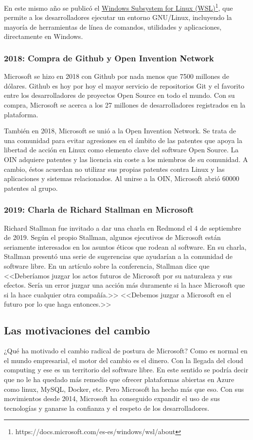 En este mismo año se publicó el \href{https://docs.microsoft.com/es-es/windows/wsl/about}{Windows Subsystem for Linux (WSL)}\footnote{https://docs.microsoft.com/es-es/windows/wsl/about}, que permite a los desarrolladores ejecutar un entorno GNU/Linux, incluyendo la mayoría de herramientas de línea de comandos, utilidades y aplicaciones, directamente en Windows.

\subsubsection{2018: Compra de Github y Open Invention Network}
Microsoft se hizo en 2018 con Github por nada menos que 7500 millones de dólares. Github es hoy por hoy el mayor servicio de repositorios Git y el favorito entre los desarrolladores de proyectos Open Source en todo el mundo. Con su compra, Microsoft se acerca a los 27 millones de desarrolladores registrados en la plataforma. \cite{xataca_2018:microsoft_gighub}

También en 2018, Microsoft se unió a la Open Invention Network. Se trata de una comunidad para evitar agresiones en el ámbito de las patentes que apoya la libertad de acción en Linux como elemento clave del software Open Source. La OIN adquiere patentes y las licencia sin coste a los miembros de su comunidad. A cambio, éstos acuerdan no utilizar sus propias patentes contra Linux y las aplicaciones y sistemas relacionados\cite{wiki_2020:open_invention_network}. Al unirse a la OIN, Microsoft abrió 60000 patentes al grupo\cite{azure_blogs_2018:microsoft_oin}.

\subsubsection{2019: Charla de Richard Stallman en Microsoft}
Richard Stallman fue invitado a dar una charla en Redmond el 4 de septiembre de 2019. Según el propio Stallman, algunos ejecutivos de Microsoft están seriamente interesados en los asuntos éticos que rodean al software. En su charla, Stallman presentó una serie de sugerencias que ayudarían a la comunidad de software libre. En un artículo sobre la conferencia, Stallman dice que <<Deberíamos juzgar los actos futuros de Microsoft por su naturaleza y sus efectos. Sería un error juzgar una acción más duramente si la hace Microsoft que si la hace cualquier otra compañía.>> <<Debemos juzgar a Microsoft en el futuro por lo que haga entonces.>> \cite{stallman_2019}

\subsection{Las motivaciones del cambio}
¿Qué ha motivado el cambio radical de postura de Microsoft? Como es normal en el mundo empresarial, el motor del cambio es el dinero. Con la llegada del cloud computing y ese es un territorio del software libre. En este sentido se podría decir que no le ha quedado más remedio que ofrecer plataformas abiertas en Azure como linux, MySQL, Docker, etc. Pero Microsoft ha hecho más que eso. Con sus movimientos desde 2014, Microsoft ha conseguido expandir el uso de sus tecnologías y ganarse la confianza y el respeto de los desarrolladores.